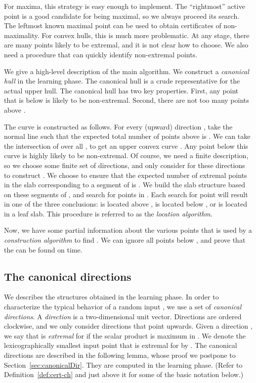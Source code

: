 \documentclass[letterpaper,11pt]{article}
\begin{document}
For maxima, this strategy is easy enough to 
implement. The ``rightmost'' active point 
is a good candidate for being maximal, so we always
proceed its search. The leftmost known maximal
point can be used to obtain certificates of non-maximality.
For convex hulls, this is much more problematic. At any 
stage, there are many points likely to be
extremal, and it is not clear how to choose.
We also need a procedure that can quickly identify
non-extremal points. 

We give a high-level 
description of the main algorithm.
We construct a \emph{canonical hull} 
 in the learning phase. The canonical hull
is a crude representative for the actual 
upper hull. The canonical hull has two key 
properties. First, any point that is below 
 is likely to be non-extremal. Second, 
there are not too many points above . 

The curve  is constructed as follows.
For every (upward) direction , take the normal line 
such that the expected total number of points above 
is . We can take the intersection of  over all ,
to get an upper convex curve . Any point below this curve is highly likely to be non-extremal.
Of course, we need a finite description, so we choose some finite set  of directions,
and only consider  for these directions to construct . We choose  to
ensure that the expected number of extremal points in the slab corresponding to a segment of  is .
We build the slab
structure  based on these segments of , and search for points
in . Each search for point  will result in one of the three conclusions:
 is located above ,  is located below , or  is located in a leaf slab.
This procedure is referred to as the \emph{location algorithm}.  

Now, we have some partial information about 
the various points that is used by
a \emph{construction algorithm} to find . We can ignore all points below ,
and prove that the  can be found on  time.

\subsection{The canonical directions}\label{sec:prelim_CH}

We describes the structures obtained 
in the learning phase.  In order 
to characterize the typical behavior 
of a random input ,
we use a set  of 
\emph{canonical directions}. A 
\emph{direction} is a two-dimensional 
unit vector. Directions are ordered 
clockwise, and we only consider 
directions that point upwards. Given 
a direction , we say that 
 is \emph{extremal} for  
if the scalar product 
 is maximum 
in . We denote the 
lexicographically smallest input 
point that is extremal for  
by .  The canonical directions 
are described in the following lemma, 
whose proof we postpone to 
Section~\ref{sec:canonicalDir}. They 
are computed in the learning phase. 
(Refer to Definition~\ref{def:cert-ch} 
and just above it for some of the 
basic notation below.)
\end{document}
